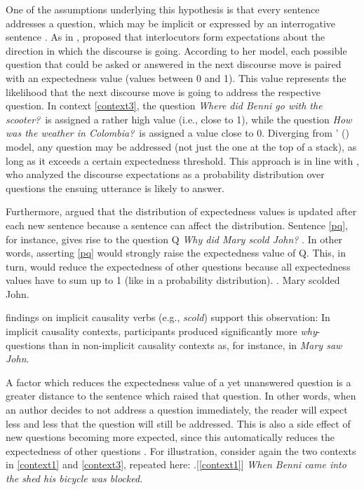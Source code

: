 \documentclass{salt}
\begin{document}
One of the assumptions underlying this hypothesis is that every sentence addresses a question, which may be implicit or expressed by an interrogative sentence \cite[following][]{roberts_2012}. As in \cite{zimmermann_2011b}, \cite{tonnis_2021} proposed that interlocutors form expectations about the direction in which the discourse is going.  According to her model, each possible question that could be asked or answered in the next discourse move is paired with an expectedness value (values between 0 and 1). This value represents the likelihood that the next discourse move is going to address the respective question. In context \ref{context3}, the question \textit{Where did Benni go with the scooter?}~is assigned a rather high value (i.e., close to 1), while the question \textit{How was the weather in Colombia?}~is assigned a value close to 0. Diverging from \citeauthor{roberts_2012}' (\citeyear{roberts_2012}) model, any question may be addressed (not just the one at the top of a stack), as long as it exceeds a certain expectedness threshold. This approach is in line with \cite{kehler_rohde_2017}, who analyzed the discourse expectations as a probability distribution over questions the ensuing utterance is likely to answer.

Furthermore, \cite{tonnis_2021} argued that the distribution of expectedness values is updated after each new sentence because a sentence can affect the distribution. Sentence \ref{pq}, for instance, gives rise to the question Q \textit{Why did Mary scold John?} \citep[e.g.,][]{onea_2016}. In other words, asserting \ref{pq} would strongly raise the expectedness value of Q. This, in turn, would reduce the expectedness of other questions because all expectedness values have to sum up to 1 (like in a probability distribution).
\ex.\label{pq} Mary scolded John.

 findings on implicit causality verbs (e.g., \textit{scold}) support this observation: In implicit causality contexts, participants produced significantly more \textit{why}-questions than in non-implicit causality contexts as, for instance, in \textit{Mary saw John}.

A factor which reduces the expectedness value of a yet unanswered question is a greater distance to the sentence which raised that question. In other words, when an author decides to not address a question immediately, the reader will expect less and less that the question will still be addressed. This is also a side effect of new questions becoming more expected, since this automatically reduces the expectedness of other questions \cite[273ff.]{tonnis_2021}. For illustration, consider again the two contexts in \ref{context1} and \ref{context3}, repeated here:
\ex.[\ref{context1}] \textit{When Benni came into the shed his bicycle was blocked.}
\end{document}
